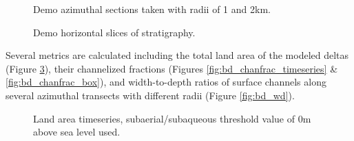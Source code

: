 \begin{figure}[!ht]
	\caption{Demo azimuthal sections taken with radii of 1 and 2km.}
	\label{fig:bd_radial}
\end{figure}

\begin{figure}
	\caption{Demo horizontal slices of stratigraphy.}
	\label{fig:bd_horiz}
\end{figure}

Several metrics are calculated including the total land area of the modeled deltas (Figure \ref{fig:bd_land_area}), their channelized fractions (Figures \ref{fig:bd_chanfrac_timeseries} \& \ref{fig:bd_chanfrac_box}), and width-to-depth ratios of surface channels along several azimuthal transects with different radii (Figure \ref{fig:bd_wd}).

\begin{figure}[!ht]
	\caption{Land area timeseries, subaerial/subaqueous threshold value of 0m above sea level used.}
	\label{fig:bd_land_area}
\end{figure}

